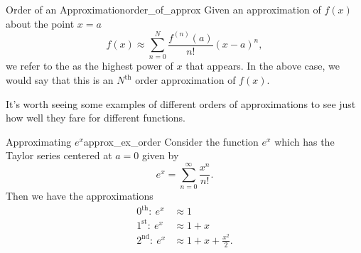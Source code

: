 \begin{df}{Order of an Approximation}{order_of_approx}
Given an approximation of $f(x)$ about the point $x=a$
\[
f(x) \approx \sum_{n=0}^N \frac{f^{(n)}(a)}{n!}(x-a)^n,
\]
we refer to the  as the highest power of $x$ that appears. In the above case, we would say that this is an $N^\textrm{th}$ order approximation of $f(x)$.
\end{df}

It's worth seeing some examples of different orders of approximations to see just how well they fare for different functions.

\begin{ex}{Approximating $e^x$}{approx_ex_order}
Consider the function $e^x$ which has the Taylor series centered at $a=0$ given by
\[
e^x = \sum_{n=0}^\infty \frac{x^n}{n!}.
\]
Then we have the approximations
\begin{align*}
    0^\textrm{th}:~e^x&\approx 1\\
    1^\textrm{st}:~e^x&\approx 1+x\\
    2^\textrm{nd}:~e^x&\approx 1+x+\frac{x^2}{2}.
\end{align*}
\end{ex}

